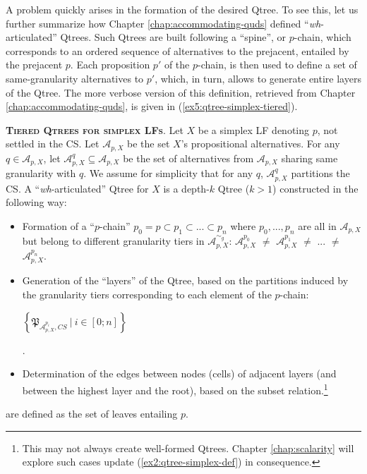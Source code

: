 A problem quickly arises in the formation of the desired Qtree.
To see this, let us further summarize how Chapter \ref{chap:accommodating-quds} defined ``\textit{wh}-articulated'' Qtrees. Such Qtrees are built following a ``spine'', or $p$-chain, which corresponds to an ordered sequence of alternatives to the prejacent, entailed by the prejacent $p$. Each proposition $p'$ of the $p$-chain, is then used to define a set of same-granularity alternatives to $p'$, which, in turn, allows to generate entire layers of the Qtree. The more verbose version of this definition, retrieved from Chapter \ref{chap:accommodating-quds}, is given in (\ref{ex5:qtree-simplex-tiered}).

\begin{exe}
	\ex\label{ex5:qtree-simplex-tiered} {\textsc{\textbf{Tiered Qtrees for simplex LFs}}.
		Let $X$ be a simplex LF denoting $p$, not settled in the CS. Let $\mathcal{A}_{p, X}$ be the set $X$'s propositional alternatives. For any $q \in  \mathcal{A}_{p, X}$, let $\mathcal{A}^q_{p, X} \subseteq \mathcal{A}_{p, X}$ be the set of alternatives from $\mathcal{A}_{p, X}$ sharing same granularity with $q$. We assume for simplicity that for any $q$, $\mathcal{A}^q_{p, X}$ partitions the CS. A ``\textit{wh}-articulated'' Qtree for $X$ is a depth-$k$ Qtree ($k > 1$) constructed in the following way:
			\begin{itemize}
				\item Formation of a ``$p$-chain'' $p_0 = p \subset p_1 \subset ... \subset p_n$ where $p_0, ...,  p_n$ are all in $\mathcal{A}_{p, X}$ but belong to different granularity tiers in $\mathcal{A}_{p, X}^{\sim_g}$:  $\mathcal{A}^{p_0}_{p, X}$ $\neq$ $\mathcal{A}^{p_1}_{p, X}$ $\neq$ ... $\neq$$\mathcal{A}^{p_n}_{p, X}$.
				\item Generation of the ``layers'' of the Qtree, based on the partitions induced by the granularity tiers corresponding to each element of the $p$-chain:\\ \begin{small}$\left\lbrace\mathfrak{P}_{\mathcal{A}^{p_i}_{p, X}, CS} \ | \ i \in [0;n]\right\rbrace$\end{small}.
				\item Determination of the edges between nodes (cells) of adjacent layers (and between the highest layer and the root), based on the subset relation.\footnote{This may not always create well-formed Qtrees. Chapter \ref{chap:scalarity} will explore such cases update (\ref{ex2:qtree-simplex-def}) in consequence.}
			\end{itemize}
		 \setlength{\fboxsep}{1pt} are defined as the set of leaves entailing $p$.
	}
\end{exe}

